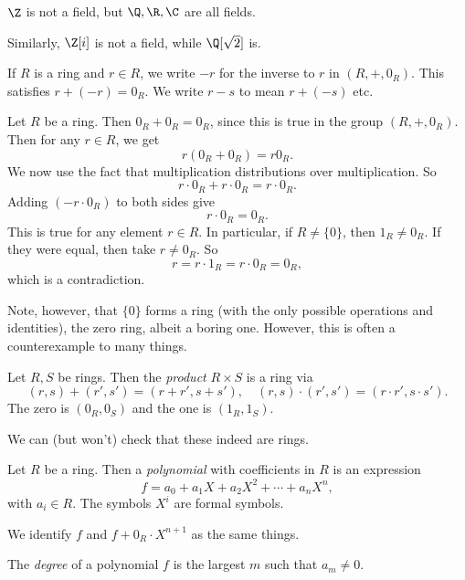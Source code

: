 \documentclass[a4paper]{article}
\begin{document}
\begin{eg}
  $\Z$ is not a field, but $\Q, \R, \C$ are all fields.

  Similarly, $\Z[i]$ is not a field, while $\Q[\sqrt{2}]$ is.
\end{eg}

\begin{notation}
  If $R$ is a ring and $r \in R$, we write $-r$ for the inverse to $r$ in $(R, +, 0_R)$. This satisfies $r + (-r) = 0_R$. We write $r - s$ to mean $r + (-s)$ etc.
\end{notation}

\begin{eg}
  Let $R$ be a ring. Then $0_R + 0_R = 0_R$, since this is true in the group $(R, +, 0_R)$. Then for any $r \in R$, we get
  \[
    r(0_R + 0_R) = r 0_R.
  \]
  We now use the fact that multiplication distributions over multiplication. So
  \[
    r \cdot 0_R + r \cdot 0_R = r \cdot 0_R.
  \]
  Adding $(-r \cdot 0_R)$ to both sides give
  \[
    r \cdot 0_R = 0_R.
  \]
  This is true for any element $r \in R$. In particular, if $R \not= \{0\}$, then $1_R \not= 0_R$. If they were equal, then take $r \not= 0_R$. So
  \[
    r = r \cdot 1_R = r \cdot 0_R = 0_R,
  \]
  which is a contradiction.
\end{eg}
Note, however, that $\{0\}$ forms a ring (with the only possible operations and identities), the zero ring, albeit a boring one. However, this is often a counterexample to many things.

\begin{defi}
  Let $R, S$ be rings. Then the \emph{product} $R \times S$ is a ring via
  \[
    (r, s) + (r', s') = (r + r', s + s'),\quad (r, s) \cdot (r', s') = (r\cdot r', s \cdot s').
  \]
  The zero is $(0_R, 0_S)$ and the one is $(1_R, 1_S)$.

  We can (but won't) check that these indeed are rings.
\end{defi}

\begin{defi}[Polynomial]
  Let $R$ be a ring. Then a \emph{polynomial} with coefficients in $R$ is an expression
  \[
    f = a_0 + a_1X + a_2 X^2 + \cdots + a_n X^n,
  \]
  with $a_i \in R$. The symbols $X^i$ are formal symbols.
\end{defi}
We identify $f$ and $f + 0_R \cdot X^{n + 1}$ as the same things.

\begin{defi}
  The \emph{degree} of a polynomial $f$ is the largest $m$ such that $a_m \not= 0$.
\end{defi}
\end{document}
